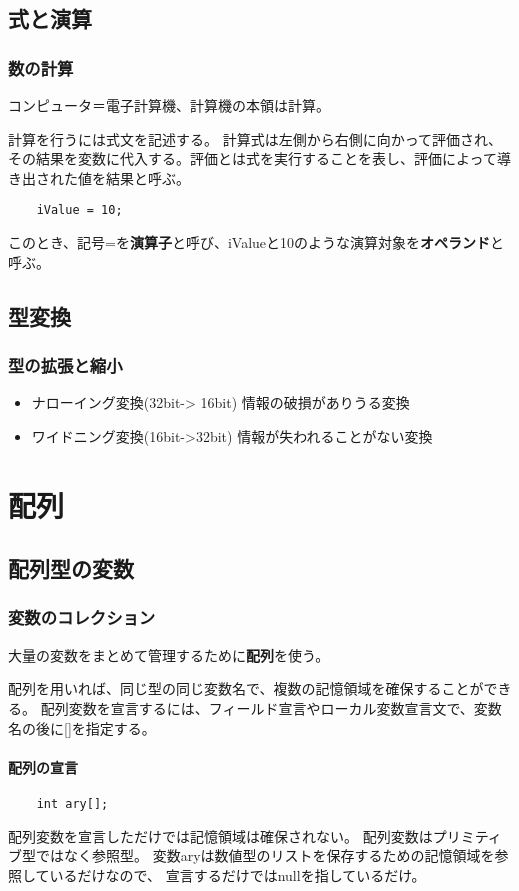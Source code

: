 \documentclass[12pt,a4j,twoside]{jsbook}
\begin{document}
\section{式と演算}
\subsection{数の計算}
コンピュータ＝電子計算機、計算機の本領は計算。

計算を行うには式文を記述する。
計算式は左側から右側に向かって評価され、その結果を変数に代入する。評価とは式を実行することを表し、評価によって導き出された値を結果と呼ぶ。
\begin{lstlisting}
    iValue = 10;
\end{lstlisting}
このとき、記号=を\textbf{演算子}と呼び、iValueと10のような演算対象を\textbf{オペランド}と呼ぶ。

\section{型変換}
\subsection{型の拡張と縮小}
\begin{itemize}
    \item ナローイング変換(32bit-> 16bit) \quad 情報の破損がありうる変換
    \item ワイドニング変換(16bit->32bit) \quad 情報が失われることがない変換
\end{itemize}




\chapter{配列}
\section{配列型の変数}
\subsection{変数のコレクション}
大量の変数をまとめて管理するために\textbf{配列}を使う。

配列を用いれば、同じ型の同じ変数名で、複数の記憶領域を確保することができる。
配列変数を宣言するには、フィールド宣言やローカル変数宣言文で、変数名の後に[]を指定する。
\subsubsection*{配列の宣言}
\begin{lstlisting}
    int ary[];
\end{lstlisting}
配列変数を宣言しただけでは記憶領域は確保されない。
配列変数はプリミティブ型ではなく参照型。
変数aryは数値型のリストを保存するための記憶領域を参照しているだけなので、
宣言するだけではnullを指しているだけ。
\end{document}
